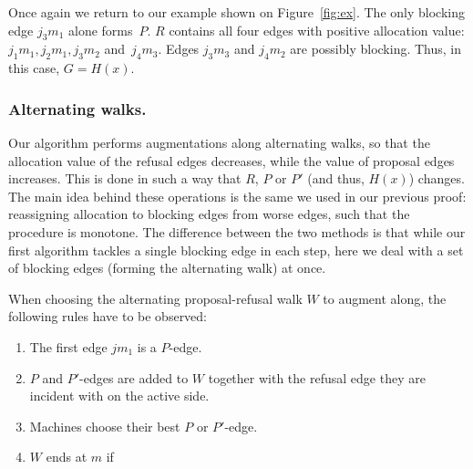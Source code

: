 \documentclass{llncs}
\begin{document}
Once again we return to our example shown on Figure~\ref{fig:ex}. The only blocking edge $j_3m_1$ alone forms~$P$. $R$ contains all four edges with positive allocation value: $j_1m_1, j_2m_1, j_3m_2$ and~$j_4m_3$. Edges $j_3m_3$ and $j_4m_2$ are possibly blocking. Thus, in this case, $G = H(x)$.



\subsubsection*{Alternating walks.}

Our algorithm performs augmentations along alternating walks, so that the allocation value of the refusal edges decreases, while the value of proposal edges increases. This is done in such a way that $R$, $P$ or $P'$ (and thus, $H(x)$) changes. The main idea behind these operations is the same we used in our previous proof: reassigning allocation to blocking edges from worse edges, such that the procedure is monotone. The difference between the two methods is that while our first algorithm tackles a single blocking edge in each step, here we deal with a set of blocking edges (forming the alternating walk) at once. 

When choosing the alternating proposal-refusal walk $W$ to augment along, the following rules have to be observed:
\begin{enumerate}
    \item The first edge $jm_1$ is a $P$-edge.
    \item $P$ and $P'$-edges are added to $W$ together with the refusal edge they are incident with on the active side.
    \item\label{bestp} Machines choose their best $P$ or $P'$-edge.
    \item\label{term} $W$ ends at $m$ if 
\end{enumerate}
\end{document}
